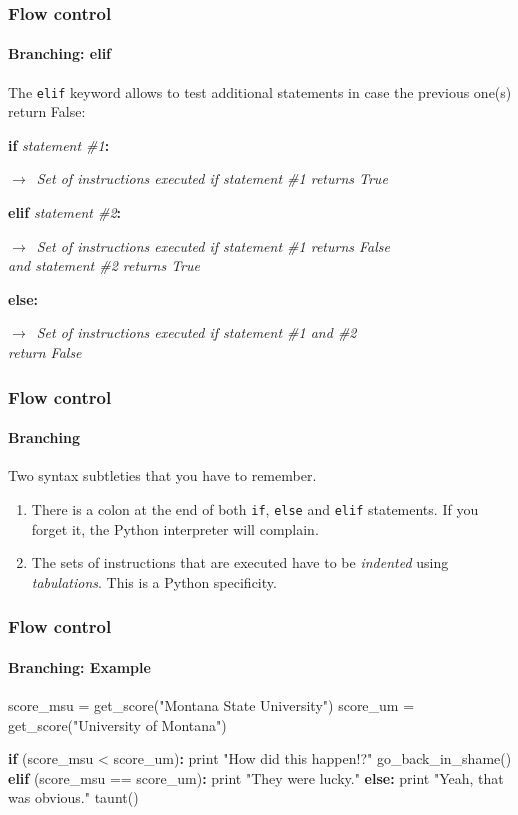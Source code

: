 \documentclass[handout]{beamer}
\newcommand{\comment}[1]{{\raggedright $\rightarrow$~\textit{\textsf{#1}}}}
\begin{document}
\begin{frame}[fragile]
	\frametitle{Flow control}
	\framesubtitle{Branching: elif}

	The \texttt{elif} keyword allows to test additional statements in case the previous one(s) return False:

	\begin{semiverbatim}
		\textbf{if} \textit{statement \#1}\textbf{:}
		  \comment{Set of instructions executed if statement \#1 returns True}
		\smallskip
		\textbf{elif} \textit{statement \#2}\textbf{:}
		  \comment{Set of instructions executed if statement \#1 returns False\\ and statement \#2 returns True}
		\smallskip
		\textbf{else:}
		  \comment{Set of instructions executed if statement \#1 and \#2\\ return False}
	\end{semiverbatim}
\end{frame}

\begin{frame}[fragile]
	\frametitle{Flow control}
	\framesubtitle{Branching}

	Two syntax subtleties that you have to remember.

	\bigskip
	\begin{enumerate}
		\item There is a colon at the end of both \texttt{if}, \texttt{else} and \texttt{elif} statements. If you forget it, the Python interpreter will complain.

		\pause
		\medskip
		\item The sets of instructions that are executed have to be \textit{indented} using \textit{tabulations}. This is a Python specificity.
	\end{enumerate}
\end{frame}

\begin{frame}[fragile]
	\frametitle{Flow control}
	\framesubtitle{Branching: Example}

	\begin{semiverbatim}
		score_msu = get_score("Montana State University")
		score_um = get_score("University of Montana")

		\textbf{if} (score_msu < score_um)\textbf{:}
		    print "How did this happen!?"
		    go_back_in_shame()		  
		\textbf{elif} (score_msu == score_um)\textbf{:}
		    print "They were lucky."
		\textbf{else:}
		    print "Yeah, that was obvious."
		    taunt()
	\end{semiverbatim}
\end{frame}
\end{document}
